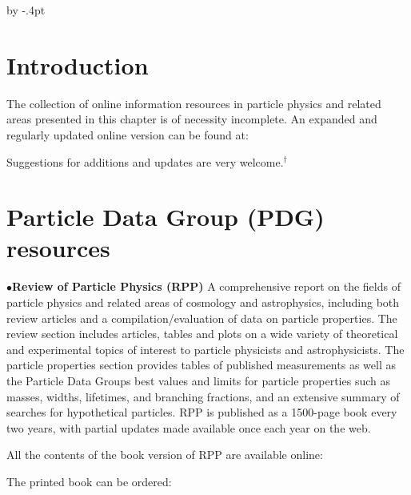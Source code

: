 \advance\baselineskip by -.4pt


\parindent=0pt
\medskip

\section{Introduction}%

The collection of online information resources in particle physics and related areas presented in this chapter is of necessity incomplete. An expanded and regularly updated online version can be found at: 
	
	\item{}

Suggestions for additions and updates are very welcome.$^\dagger$ 


\section{Particle Data Group (PDG) resources}%

\item{$\bullet$}{\bf Review of Particle Physics (RPP)}
A comprehensive report on the fields of particle physics and related areas of cosmology and astrophysics, including both review articles and a compilation/evaluation of data on particle properties. The review section includes articles, tables and plots on a wide variety of theoretical and experimental topics of interest to particle physicists and astrophysicists. The particle properties section provides tables of published measurements as well as the Particle Data Groups best values and limits for particle properties such as masses, widths, lifetimes, and branching fractions, and an extensive summary of searches for hypothetical particles. RPP is published as a 1500-page book every two years, with partial updates made available once each year on the web.

\item{} All the contents of the book version of RPP are available online:

         \item{}

\item{} The printed book can be ordered:

         \item{}


